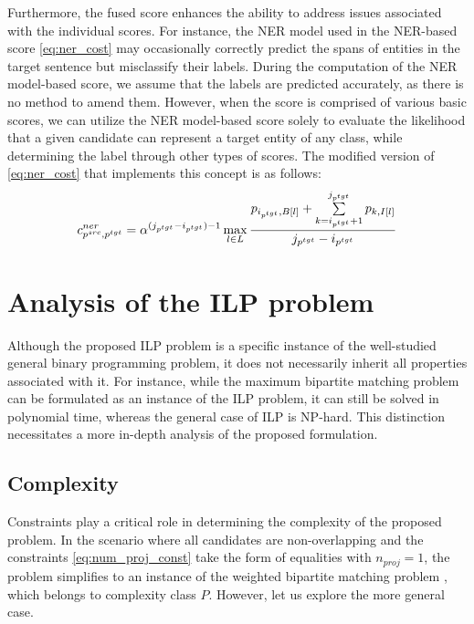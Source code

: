 Furthermore, the fused score enhances the ability to address issues associated with
the individual scores. For instance, the NER model used in the NER-based score
\eqref{eq:ner_cost} may occasionally correctly predict the spans of entities in the
target sentence but misclassify their labels. During the computation of the NER
model-based score, we assume that the labels are predicted accurately, as there is
no method to amend them. However, when the score is comprised of various basic scores,
we can utilize the NER model-based score solely to evaluate the likelihood that a
given candidate can represent a target entity of any class, while determining the
label through other types of scores. The modified version of \eqref{eq:ner_cost} that
implements this concept is as follows:
\begin{equation} \label{eq:ner_cost_wo_classes}
  c_{p^{src}, p^{tgt}}^{ner} = \alpha^{(j_{p^{tgt}} - i_{p^{tgt}}) - 1}
  \max\limits_{l \in L}
  \frac{
    p_{i_{p^{tgt}}, B[l]} +
    \sum\limits_{k = i_{p^{tgt}} + 1}^{j_{p^{tgt}}} p_{k, I[l]}
  }
  {j_{p^{tgt}} - i_{p^{tgt}}}
\end{equation}

\section{Analysis of the ILP problem}
Although the proposed ILP problem is a specific instance of the
well-studied general binary programming problem, it does not
necessarily inherit all properties associated with it. For instance,
while the maximum bipartite matching problem \cite{pemmaraju2003computational} can be formulated as an
instance of the ILP problem, it can still be solved in polynomial
time, whereas the general case of ILP is NP-hard. This distinction
necessitates a more in-depth analysis of the proposed formulation.

\subsection{Complexity}
Constraints play a critical role in determining the complexity of the proposed problem.
In the scenario where all candidates are non-overlapping and the constraints
\eqref{eq:num_proj_const} take the form of equalities with \( n_{proj} = 1 \),
the problem simplifies to an instance of the weighted bipartite matching problem
\cite{pemmaraju2003computational}, which belongs to complexity class \( P \).
However, let us explore the more general case.

